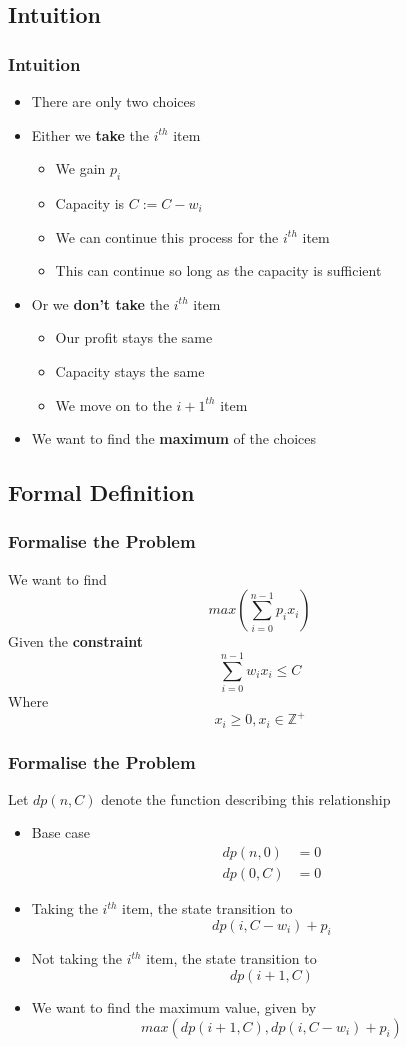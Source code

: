 \documentclass{beamer}
\begin{document}
\subsection{Intuition}
\begin{frame}
\frametitle{Intuition}
	\begin{itemize}
		\item There are only two choices
		\item Either we \textbf{take} the \( i^{th} \)  item 
			\begin{itemize}
				\item We gain \( p_i \)
				\item Capacity is \(C := C - w_i \)  
				\item We can continue this process for the \( i^{th} \) item
				\item This can continue so long as the capacity is sufficient 
			\end{itemize}
		\item Or we \textbf{don't take} the \( i^{th} \)  item
			\begin{itemize}
				\item Our profit stays the same
				\item Capacity stays the same 
				\item We move on to the \( i+1^{th} \) item
			\end{itemize}
		\item We want to find the \textbf{maximum} of the choices 
	\end{itemize}	
\end{frame}

\subsection{Formal Definition}
\begin{frame}
	\frametitle{Formalise the Problem}
	We want to find 
	\[
		max\left( \sum_{ i = 0 }^{ n - 1 }{ p_ix_i }  \right) 
	\]
	Given the \textbf{constraint}  
	\[
		\sum_{ i = 0 }^{ n -1 }{ w_ix_i } \leq C 
	\]
	Where
	\[
		x_i \geq 0, x_i \in \mathbb{Z}^+
	\]
\end{frame}

\begin{frame}
	\frametitle{Formalise the Problem}
	Let \( dp(n, C) \) denote the function describing this relationship
	\begin{itemize}
		\item Base case 
			\begin{align*}	
				dp(n, 0) &= 0\\
				dp(0, C) &= 0 
			\end{align*}	
		\item Taking the \( i^{th} \) item, the state transition to
			\[
				dp(i, C-w_i) + p_i
			\]
		\item Not taking the \( i^{th} \) item, the state transition to
			\[
				dp(i+1, C)
			\]
		\item We want to find the maximum value, given by
			\[
				max(dp(i+1, C), dp(i, C-w_i) + p_i)
			\]
	\end{itemize}
\end{frame}
\end{document}
